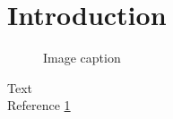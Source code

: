 \section{Introduction}

\begin{figure}[h]
	\centering
	\caption[short caption]{Image caption}
	\label{fig:}
\end{figure}

Text\\

Reference \ref{fig:}\\
